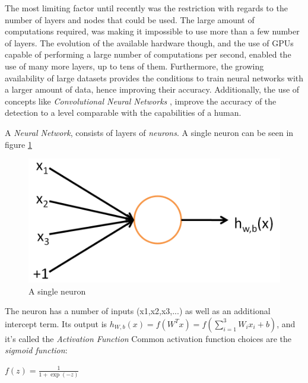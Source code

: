 \documentclass[final,12p,times]{elsarticle}
\begin{document}
The most limiting factor until recently was the restriction with regards to the number of layers and nodes that could be used.
The large amount of computations required, was making it impossible to use more than a few number of layers.
The evolution of the available hardware though, and the use of GPUs capable of performing a large number of computations per second, 
enabled the use of many more layers, up to tens of them.
Furthermore, the growing availability of large datasets provides the conditions to train neural networks with a larger amount of data, 
hence improving their accuracy.
Additionally, the use of concepts like \emph{Convolutional Neural Networks} \cite{Fukushima1980} \cite{Lecun98gradient-basedlearning}, 
improve the accuracy of the detection to a level comparable with the capabilities of a human.

A \emph{Neural Network}, consists of layers of \emph{neurons}.
A single neuron can be seen in figure \ref{fig:Fig2.1}

\begin{figure}[H]
  \includegraphics[width=1.0\textwidth, center]{SingleNeuron.png}
  \caption{A single neuron}
  \label{fig:Fig2.1}
  \end{figure}
  
The neuron has a number of inputs (x1,x2,x3,...) as well as an additional intercept term.
Its output is \begin{math} h_{W,b}(x) = f(W^Tx) = f(\sum_{i=1}^3 W_{i}x_i +b)\end{math}, 
and it's called the \emph{Activation Function}
Common activation function choices are the \emph{sigmoid function}:


\begin{math}f(z) = \frac{1}{1+\exp(-z)}\end{math}
\end{document}
